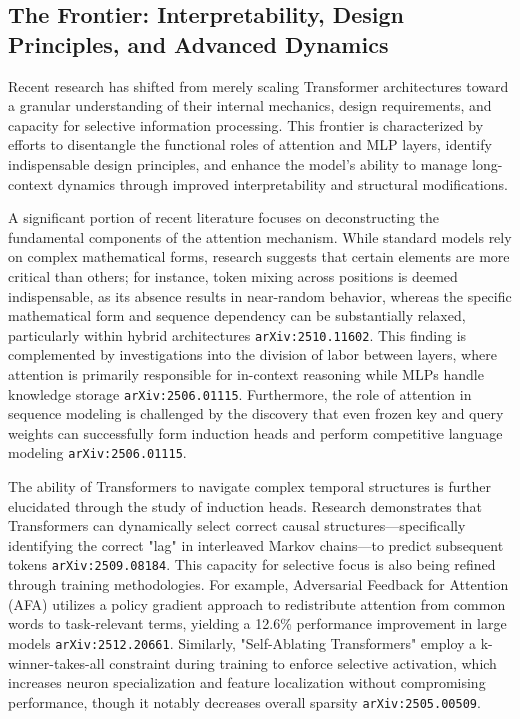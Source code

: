 \documentclass[11pt]{article}
\begin{document}
\subsection{The Frontier: Interpretability, Design Principles, and Advanced Dynamics}

Recent research has shifted from merely scaling Transformer architectures toward a granular understanding of their internal mechanics, design requirements, and capacity for selective information processing. This frontier is characterized by efforts to disentangle the functional roles of attention and MLP layers, identify indispensable design principles, and enhance the model's ability to manage long-context dynamics through improved interpretability and structural modifications.

A significant portion of recent literature focuses on deconstructing the fundamental components of the attention mechanism. While standard models rely on complex mathematical forms, research suggests that certain elements are more critical than others; for instance, token mixing across positions is deemed indispensable, as its absence results in near-random behavior, whereas the specific mathematical form and sequence dependency can be substantially relaxed, particularly within hybrid architectures \texttt{arXiv:2510.11602}. This finding is complemented by investigations into the division of labor between layers, where attention is primarily responsible for in-context reasoning while MLPs handle knowledge storage \texttt{arXiv:2506.01115}. Furthermore, the role of attention in sequence modeling is challenged by the discovery that even frozen key and query weights can successfully form induction heads and perform competitive language modeling \texttt{arXiv:2506.01115}.

The ability of Transformers to navigate complex temporal structures is further elucidated through the study of induction heads. Research demonstrates that Transformers can dynamically select correct causal structures—specifically identifying the correct "lag" in interleaved Markov chains—to predict subsequent tokens \texttt{arXiv:2509.08184}. This capacity for selective focus is also being refined through training methodologies. For example, Adversarial Feedback for Attention (AFA) utilizes a policy gradient approach to redistribute attention from common words to task-relevant terms, yielding a 12.6\% performance improvement in large models \texttt{arXiv:2512.20661}. Similarly, "Self-Ablating Transformers" employ a k-winner-takes-all constraint during training to enforce selective activation, which increases neuron specialization and feature localization without compromising performance, though it notably decreases overall sparsity \texttt{arXiv:2505.00509}.
\end{document}
